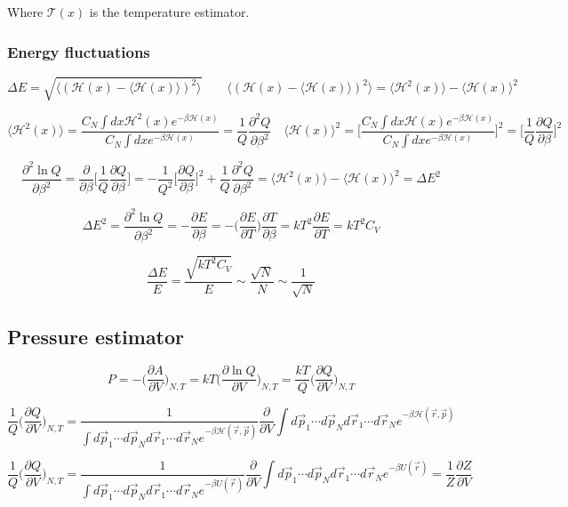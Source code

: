 	Where $\mathcal{T}(x)$ is the temperature estimator.

		\subsubsection{Energy fluctuations}

		$$\Delta E = \sqrt{\langle(\mathcal{H}(x)-\langle\mathcal{H}(x)\rangle)^2\rangle}\qquad \langle(\mathcal{H}(x)-\langle\mathcal{H}(x)\rangle)^2\rangle = \langle\mathcal{H}^2(x)\rangle - \langle\mathcal{H}(x)\rangle^2$$

		$$\langle\mathcal{H}^2(x)\rangle = \frac{C_N\int dx\mathcal{H}^2(x)e^{-\beta\mathcal{H}(x)}}{C_N\int dxe^{-\beta\mathcal{H}(x)}} = \frac{1}{Q}\frac{\partial^2 Q}{\partial \beta^2}\quad\langle\mathcal{H}(x)\rangle^2 = \biggl[\frac{C_N\int dx\mathcal{H}(x)e^{-\beta\mathcal{H}(x)}}{C_N\int dx e^{-\beta\mathcal{H}(x)}}\biggr]^2 = \biggl[\frac{1}{Q}\frac{\partial Q}{\partial\beta}\biggr]^2$$

		$$\frac{\partial^2\ln Q}{\partial \beta^2} = \frac{\partial}{\partial\beta}\biggl[\frac{1}{Q}\frac{\partial Q}{\partial\beta}\biggr] = -\frac{1}{Q^2}\biggl[\frac{\partial Q}{\partial\beta}\biggr]^2 + \frac{1}{Q}\frac{\partial^2 Q}{\partial\beta^2} = \langle\mathcal{H}^2(x)\rangle-\langle\mathcal{H}(x)\rangle^2 = \Delta E^2$$

		$$\Delta E^2 = \frac{\partial^2\ln Q}{\partial\beta^2} = -\frac{\partial E}{\partial\beta} = -\biggl(\frac{\partial E}{\partial T}\biggr)\frac{\partial T}{\partial\beta} = kT^2\frac{\partial E}{\partial T} = kT^2C_V$$

		$$\frac{\Delta E}{E} = \frac{\sqrt{kT^2C_V}}{E}\sim\frac{\sqrt{N}}{N}\sim\frac{1}{\sqrt{N}}$$

	\subsection{Pressure estimator}

	$$P = -\biggl(\frac{\partial A}{\partial V}\biggr)_{N, T} = kT\biggl(\frac{\partial \ln Q}{\partial V}\biggr)_{N, T} = \frac{kT}{Q}\biggl(\frac{\partial Q}{\partial V}\biggr)_{N, T}$$

	$$\frac{1}{Q}\biggl(\frac{\partial Q}{\partial V}\biggr)_{N, T} = \frac{1}{\int d\vec{p}_1\cdots d\vec{p}_Nd\vec{r}_1\cdots d\vec{r}_Ne^{-\beta\mathcal{H}(\vec{r},\vec{p})}}\frac{\partial}{\partial V}\int d\vec{p}_1\cdots d\vec{p}_Nd\vec{r}_1\cdots d\vec{r}_N e^{-\beta\mathcal{H}(\vec{r},\vec{p})}$$

	$$\frac{1}{Q}\biggl(\frac{\partial Q}{\partial V}\biggr)_{N, T} = \frac{1}{\int d\vec{p}_1\cdots d\vec{p}_Nd\vec{r}_1\cdots d\vec{r}_Ne^{-\beta U(\vec{r})}}\frac{\partial}{\partial V}\int d\vec{p}_1\cdots d\vec{p}_Nd\vec{r}_1\cdots d\vec{r}_N e^{-\beta U(\vec{r})} = \frac{1}{Z}\frac{\partial Z}{\partial V}$$


